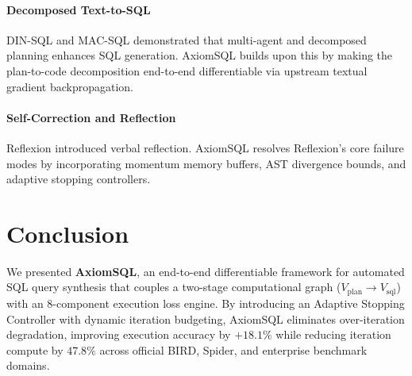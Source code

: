 \documentclass[conference]{IEEEtran}
\begin{document}
\paragraph{Decomposed Text-to-SQL} DIN-SQL \cite{pourreza2023dinsql} and MAC-SQL \cite{wang2024macsql} demonstrated that multi-agent and decomposed planning enhances SQL generation. AxiomSQL builds upon this by making the plan-to-code decomposition end-to-end differentiable via upstream textual gradient backpropagation.

\paragraph{Self-Correction and Reflection} Reflexion \cite{shinn2023reflexion} introduced verbal reflection. AxiomSQL resolves Reflexion's core failure modes by incorporating momentum memory buffers, AST divergence bounds, and adaptive stopping controllers.

\section{Conclusion}

We presented \textbf{AxiomSQL}, an end-to-end differentiable framework for automated SQL query synthesis that couples a two-stage computational graph ($V_{\text{plan}} \to V_{\text{sql}}$) with an 8-component execution loss engine. By introducing an Adaptive Stopping Controller with dynamic iteration budgeting, AxiomSQL eliminates over-iteration degradation, improving execution accuracy by $+18.1\%$ while reducing iteration compute by $47.8\%$ across official BIRD, Spider, and enterprise benchmark domains.



\end{document}
